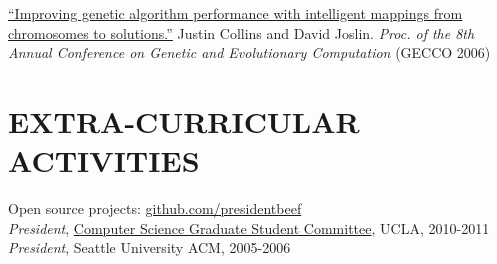 \documentclass[margin]{res}
\begin{document}
\begin{resume}
		\href{http://cs.ucla.edu/~collins/documents/Collins_Joslin-GECCO06-abstract.pdf}{``Improving genetic algorithm performance with intelligent mappings from chromosomes to solutions.''} Justin Collins and David Joslin. 
		{\it Proc. of the 8th Annual Conference on Genetic and Evolutionary Computation} (GECCO 2006)

		\section{EXTRA-CURRICULAR \\ ACTIVITIES}             

		Open source projects: \href{http://github.com/presidentbeef}{github.com/presidentbeef}\\
		{\sl President}, \href{http://csgsc.cs.ucla.edu/}{Computer Science Graduate Student Committee}, UCLA, 2010-2011 \\
		{\sl President}, Seattle University ACM, 2005-2006

	\end{resume}
\end{document}
